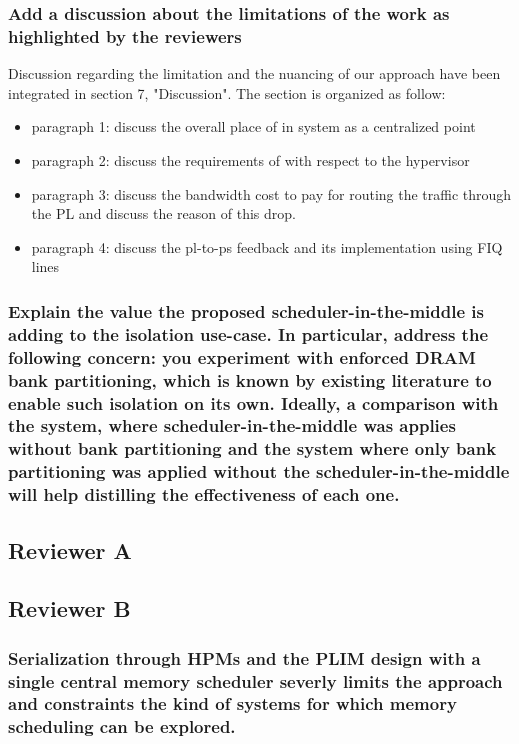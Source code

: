         \subsubsection{Add a discussion about the limitations of the work as highlighted by the reviewers}
            Discussion regarding the limitation and the nuancing of our approach have been integrated in section 7, "Discussion".
            The section is organized as follow:
            \begin{itemize}
                \item paragraph 1: discuss the overall place of \schim in system as a centralized point
                \item paragraph 2: discuss the requirements of \schim with respect to the hypervisor
                \item paragraph 3: discuss the bandwidth cost to pay for routing the traffic through the PL and discuss the reason of this drop.
                \item paragraph 4: discuss the pl-to-ps feedback and its implementation using FIQ lines
            \end{itemize}

        \subsubsection{Explain the value the proposed scheduler-in-the-middle is adding to the isolation use-case. In particular, address the following concern: you experiment with enforced DRAM bank partitioning, which is known by existing literature to enable such isolation on its own. Ideally, a comparison with the system, where scheduler-in-the-middle was applies without bank partitioning and the system where only bank partitioning was applied without the scheduler-in-the-middle will help distilling the effectiveness of each one.}


    \subsection{Reviewer A}

    \subsection{Reviewer B}
        \subsubsection{Serialization through HPMs and the PLIM design with a single central memory scheduler severly limits the approach and constraints the kind of systems for which memory scheduling can be explored.}


